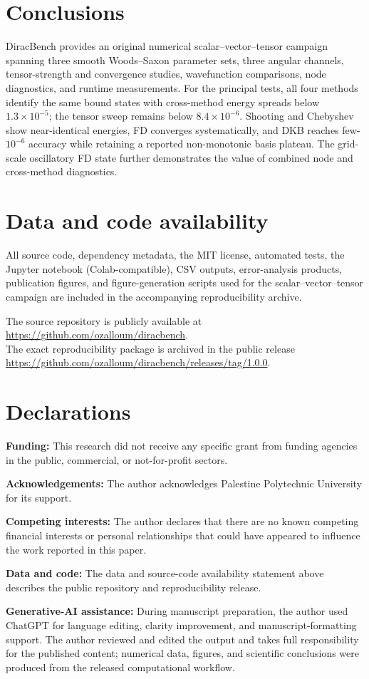 \documentclass[a4paper,fleqn]{cas-dc}
\begin{document}
\section{Conclusions}

DiracBench provides an original numerical scalar--vector--tensor campaign spanning three smooth Woods--Saxon parameter sets, three angular channels, tensor-strength and convergence studies, wavefunction comparisons, node diagnostics, and runtime measurements. For the principal tests, all four methods identify the same bound states with cross-method energy spreads below $1.3\times10^{-5}$; the tensor sweep remains below $8.4\times10^{-6}$. Shooting and Chebyshev show near-identical energies, FD converges systematically, and DKB reaches few-$10^{-6}$ accuracy while retaining a reported non-monotonic basis plateau. The grid-scale oscillatory FD state further demonstrates the value of combined node and cross-method diagnostics.

\section*{Data and code availability}
All source code, dependency metadata, the MIT license, automated tests, the Jupyter notebook (Colab-compatible), CSV outputs, error-analysis products, publication figures, and figure-generation scripts used for the scalar--vector--tensor campaign are included in the accompanying reproducibility archive.

The source repository is publicly available at
\url{https://github.com/ozalloum/diracbench}.\\
The exact reproducibility package is archived in the public release
\url{https://github.com/ozalloum/diracbench/releases/tag/1.0.0}.

\section*{Declarations}
\noindent\textbf{Funding:} This research did not receive any specific grant from funding agencies in the public, commercial, or not-for-profit sectors.\par\smallskip
\noindent\textbf{Acknowledgements:} The author acknowledges Palestine Polytechnic University for its support.\par\smallskip
\noindent\textbf{Competing interests:} The author declares that there are no known competing financial interests or personal relationships that could have appeared to influence the work reported in this paper.\par\smallskip
\noindent\textbf{Data and code:} The data and source-code availability statement above describes the public repository and reproducibility release.\par\smallskip
\noindent\textbf{Generative-AI assistance:} During manuscript preparation, the author used ChatGPT for language editing, clarity improvement, and manuscript-formatting support. The author reviewed and edited the output and takes full responsibility for the published content; numerical data, figures, and scientific conclusions were produced from the released computational workflow.
\renewcommand{\bibsection}{}
\end{document}
